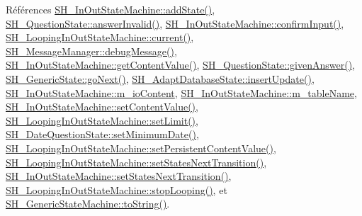Références \hyperlink{classSH__InOutStateMachine_a3de9dedcdfd6efab868484c047638f71}{S\-H\-\_\-\-In\-Out\-State\-Machine\-::add\-State()}, \hyperlink{classSH__QuestionState_a3348a8a683130678ac87a10ba2a25486}{S\-H\-\_\-\-Question\-State\-::answer\-Invalid()}, \hyperlink{classSH__InOutStateMachine_a7f7d9c9300c1d05bce2c26029f28cc31}{S\-H\-\_\-\-In\-Out\-State\-Machine\-::confirm\-Input()}, \hyperlink{classSH__LoopingInOutStateMachine_afce58401195a4941b1939c46f1caa23b}{S\-H\-\_\-\-Looping\-In\-Out\-State\-Machine\-::current()}, \hyperlink{classSH__MessageManager_a379f2aa0a590a5add34dbe91f98b2ff7}{S\-H\-\_\-\-Message\-Manager\-::debug\-Message()}, \hyperlink{classSH__InOutStateMachine_aa1a3bd3c0ea8a59b9bc916dc718eb9ca}{S\-H\-\_\-\-In\-Out\-State\-Machine\-::get\-Content\-Value()}, \hyperlink{classSH__QuestionState_a29cdea8bc55e39e3ed02d24743c30f8c}{S\-H\-\_\-\-Question\-State\-::given\-Answer()}, \hyperlink{classSH__GenericState_a34c1bebc765cc3a62d66c94c37d4f0c3}{S\-H\-\_\-\-Generic\-State\-::go\-Next()}, \hyperlink{classSH__AdaptDatabaseState_a037db544ea05f42d21fcbdda758839fe}{S\-H\-\_\-\-Adapt\-Database\-State\-::insert\-Update()}, \hyperlink{classSH__InOutStateMachine_a8cfbc27eef057bf37b7711bdfef2077e}{S\-H\-\_\-\-In\-Out\-State\-Machine\-::m\-\_\-io\-Content}, \hyperlink{classSH__InOutStateMachine_aa009eecc5ab6181358faafb5996b6006}{S\-H\-\_\-\-In\-Out\-State\-Machine\-::m\-\_\-table\-Name}, \hyperlink{classSH__InOutStateMachine_a9ab1534306b2bdb62743d4bcefe40c17}{S\-H\-\_\-\-In\-Out\-State\-Machine\-::set\-Content\-Value()}, \hyperlink{classSH__LoopingInOutStateMachine_a6dbf2fbcc6524bba5a70baadb8d61be4}{S\-H\-\_\-\-Looping\-In\-Out\-State\-Machine\-::set\-Limit()}, \hyperlink{classSH__DateQuestionState_a28dba9f895682e7722c1a245e0aac713}{S\-H\-\_\-\-Date\-Question\-State\-::set\-Minimum\-Date()}, \hyperlink{classSH__LoopingInOutStateMachine_a99686121d80e3de4c64bebb1d5890ac0}{S\-H\-\_\-\-Looping\-In\-Out\-State\-Machine\-::set\-Persistent\-Content\-Value()}, \hyperlink{classSH__LoopingInOutStateMachine_a0ee122553641721012f3710e71cce234}{S\-H\-\_\-\-Looping\-In\-Out\-State\-Machine\-::set\-States\-Next\-Transition()}, \hyperlink{classSH__InOutStateMachine_a70d6d81c0a8d4afd6aab0a7239edc237}{S\-H\-\_\-\-In\-Out\-State\-Machine\-::set\-States\-Next\-Transition()}, \hyperlink{classSH__LoopingInOutStateMachine_a73d75e30318da22fec99387e9bf02a9b}{S\-H\-\_\-\-Looping\-In\-Out\-State\-Machine\-::stop\-Looping()}, et \hyperlink{classSH__GenericStateMachine_a85c0c1c9d258ae991f84667412fa47cd}{S\-H\-\_\-\-Generic\-State\-Machine\-::to\-String()}.


